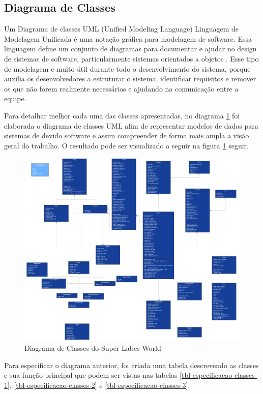\begin{landscape}
\section{Diagrama de Classes}
Um Diagrama de classes UML (Unified Modeling Language) Linguagem de Modelagem Unificada é uma notação gráfica para modelagem de software. Essa linguagem define um conjunto de diagramas para documentar e ajudar no design de sistemas de software, particularmente sistemas orientados a objetos \cite{engsoftmoderna}. Esse tipo de modelagem e muito útil durante todo o desenvolvimento do sistema, porque auxilia os desenvolvedores a estruturar o sistema, identificar requisitos e remover os que não forem realmente necessários e ajudando na comunicação entre a equipe.

Para detalhar melhor cada uma das classes apresentadas, no diagrama \ref{fig:diagrama-de-classes-uml} foi elaborada o diagrama de classes UML afim de representar modelos de dados para sistemas de devido software e assim compreender de forma mais ampla a visão geral do trabalho. O resultado pode ser visualizado a seguir na figura \ref{fig:diagrama-de-classes-uml}
seguir. 
\begin{figure}[h!]
    \centering
    \includegraphics[width=0.8\linewidth]{figuras/diagrama-de-classes-uml.png}
    \caption{Diagrama de Classes do Super Labes World}
    \label{fig:diagrama-de-classes-uml}
\end{figure}
\end{landscape}

Para especificar o diagrama anterior, foi criada uma tabela descrevendo as classes e sua função principal que podem ser vistas nas tabelas \ref{tbl-especificacao-classes-1}, \ref{tbl-especificacao-classes-2} e \ref{tbl-especificacao-classes-3}.

